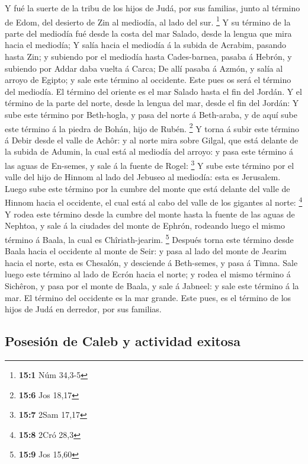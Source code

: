  Y fué la suerte de la tribu de los hijos de Judá, por sus
familias, junto al término de Edom, del desierto de Zin al mediodía, al
lado del sur. \footnote{\textbf{15:1} Núm 34,3-5}  Y su
término de la parte del mediodía fué desde la costa del mar Salado,
desde la lengua que mira hacia el mediodía;  Y salía hacia
el mediodía á la subida de Acrabim, pasando hasta Zin; y subiendo por el
mediodía hasta Cades-barnea, pasaba á Hebrón, y subiendo por Addar daba
vuelta á Carca;  De allí pasaba á Azmón, y salía al arroyo
de Egipto; y sale este término al occidente. Este pues os será el
término del mediodía.  El término del oriente es el mar
Salado hasta el fin del Jordán. Y el término de la parte del norte,
desde la lengua del mar, desde el fin del Jordán:  Y sube
este término por Beth-hogla, y pasa del norte á Beth-araba, y de aquí
sube este término á la piedra de Bohán, hijo de Rubén. \footnote{\textbf{15:6}
  Jos 18,17}  Y torna á subir este término á Debir desde el
valle de Achôr: y al norte mira sobre Gilgal, que está delante de la
subida de Adumin, la cual está al mediodía del arroyo: y pasa este
término á las aguas de En-semes, y sale á la fuente de Rogel:
\footnote{\textbf{15:7} 2Sam 17,17}  Y sube este término por
el valle del hijo de Hinnom al lado del Jebuseo al mediodía: esta es
Jerusalem. Luego sube este término por la cumbre del monte que está
delante del valle de Hinnom hacia el occidente, el cual está al cabo del
valle de los gigantes al norte: \footnote{\textbf{15:8} 2Cró 28,3}
 Y rodea este término desde la cumbre del monte hasta la
fuente de las aguas de Nephtoa, y sale á la ciudades del monte de
Ephrón, rodeando luego el mismo término á Baala, la cual es
Chîriath-jearim. \footnote{\textbf{15:9} Jos 15,60} 
Después torna este término desde Baala hacia el occidente al monte de
Seir: y pasa al lado del monte de Jearim hacia el norte, esta es
Chesalón, y desciende á Beth-semes, y pasa á Timna.  Sale
luego este término al lado de Ecrón hacia el norte; y rodea el mismo
término á Sichêron, y pasa por el monte de Baala, y sale á Jabneel: y
sale este término á la mar.  El término del occidente es la
mar grande. Este pues, es el término de los hijos de Judá en derredor,
por sus familias.

\hypertarget{posesiuxf3n-de-caleb-y-actividad-exitosa}{%
\subsection{Posesión de Caleb y actividad
exitosa}\label{posesiuxf3n-de-caleb-y-actividad-exitosa}}

